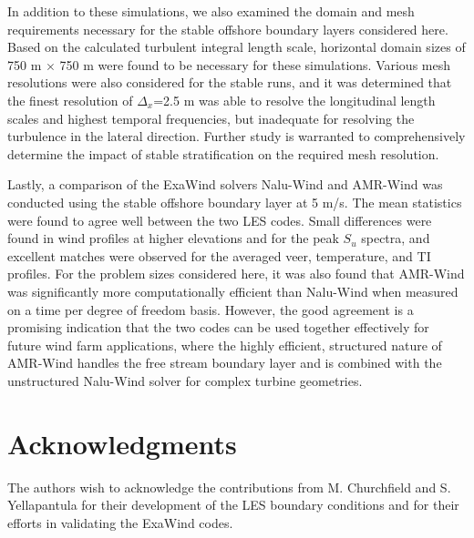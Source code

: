 \documentclass[conf]{new-aiaa}
\begin{document}
In addition to these simulations, we also examined the domain and mesh
requirements necessary for the stable offshore boundary layers
considered here.  Based on the calculated turbulent integral
length scale, horizontal domain sizes of 750 m $\times$ 750 m were found
to be necessary for these simulations.  Various mesh resolutions were
also considered for the stable runs, and it was determined that the
finest resolution of $\Delta_x$=2.5 m was able to resolve the longitudinal
length scales and highest temporal frequencies, but inadequate for
resolving the turbulence in the lateral direction.  Further study is
warranted to comprehensively determine the impact of stable
stratification on the required mesh resolution.

Lastly, a comparison of the ExaWind solvers Nalu-Wind and AMR-Wind was
conducted using the stable offshore boundary layer at 5 m/s.  The mean
statistics were found to agree well between the two LES codes.  Small
differences were found in wind profiles at higher elevations and for
the peak $S_u$ spectra, and excellent matches were observed for the
averaged veer, temperature, and TI profiles.  For the problem sizes
considered here, it was also found that AMR-Wind was significantly
more computationally efficient than Nalu-Wind when measured on a time
per degree of freedom basis.  However, the good agreement is a
promising indication that the two codes can be used together
effectively for future wind farm applications, where the highly
efficient, structured nature of AMR-Wind handles the free stream
boundary layer and is combined with the unstructured Nalu-Wind solver
for complex turbine geometries.




\section*{Acknowledgments}

The authors wish to acknowledge the contributions from M. Churchfield
and S. Yellapantula for their development of the LES boundary
conditions and for their efforts in validating the ExaWind codes.
\end{document}
